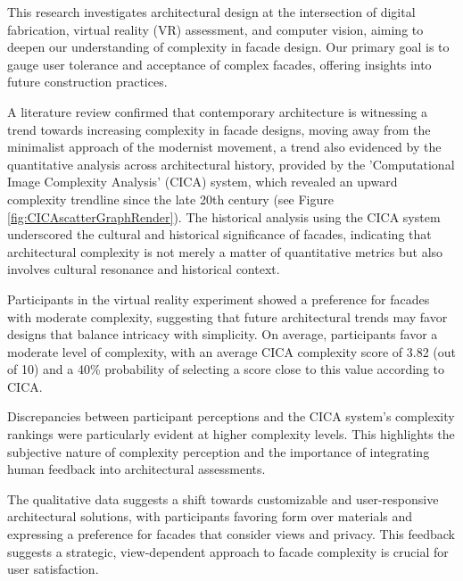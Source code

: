 


This research investigates architectural design at the intersection of digital fabrication, virtual reality (VR) assessment, and computer vision, aiming to deepen our understanding of complexity in facade design.
Our primary goal is to gauge user tolerance and acceptance of complex facades, offering insights into future construction practices.

A literature review confirmed that contemporary architecture is witnessing a trend towards increasing complexity in facade designs, moving away from the minimalist approach of the modernist movement, a trend also evidenced by the quantitative analysis across architectural history, provided by the 'Computational Image Complexity Analysis' (CICA) system, which revealed an upward complexity trendline since the late 20th century (see Figure \ref{fig:CICAscatterGraphRender}).
The historical analysis using the CICA system underscored the cultural and historical significance of facades, indicating that architectural complexity is not merely a matter of quantitative metrics but also involves cultural resonance and historical context.

Participants in the virtual reality experiment showed a preference for facades with moderate complexity, suggesting that future architectural trends may favor designs that balance intricacy with simplicity.
On average, participants favor a moderate level of complexity, with an average CICA complexity score of 3.82 (out of 10) and a 40\% probability of selecting a score close to this value according to CICA.

Discrepancies between participant perceptions and the CICA system's complexity rankings were particularly evident at higher complexity levels.
This highlights the subjective nature of complexity perception and the importance of integrating human feedback into architectural assessments.

The qualitative data suggests a shift towards customizable and user-responsive architectural solutions, with participants favoring form over materials and expressing a preference for facades that consider views and privacy.
This feedback suggests a strategic, view-dependent approach to facade complexity is crucial for user satisfaction.

